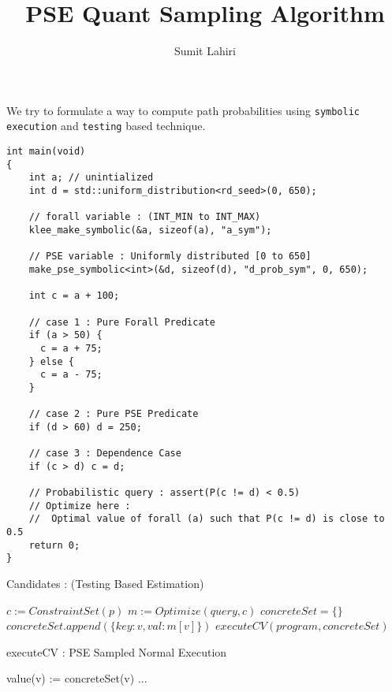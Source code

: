 \documentclass{article}
\title{PSE Quant Sampling Algorithm}
\author{Sumit Lahiri}
\begin{document}
\maketitle

We try to formulate a way to compute path probabilities using \texttt{symbolic execution} and \texttt{testing} based technique.
\begin{verbatim} 
int main(void)
{
	int a; // unintialized
	int d = std::uniform_distribution<rd_seed>(0, 650);
	
	// forall variable : (INT_MIN to INT_MAX)
	klee_make_symbolic(&a, sizeof(a), "a_sym");
	
	// PSE variable : Uniformly distributed [0 to 650]
	make_pse_symbolic<int>(&d, sizeof(d), "d_prob_sym", 0, 650);
	
	int c = a + 100;
	
	// case 1 : Pure Forall Predicate
	if (a > 50) {
	  c = a + 75;
	} else {
	  c = a - 75;
	}
	
	// case 2 : Pure PSE Predicate
	if (d > 60) d = 250;
	
	// case 3 : Dependence Case
	if (c > d) c = d;

	// Probabilistic query : assert(P(c != d) < 0.5)
	// Optimize here : 
	//	Optimal value of forall (a) such that P(c != d) is close to 0.5 	
	return 0;
}
\end{verbatim}

\begin{algorithm}[H]
	\caption{Candidates : (Testing Based Estimation)}
	\begin{algorithmic}[1]
		\State $c := ConstraintSet(p)$ 
		\State $m := Optimize(query,  c)$ 
		\State $concreteSet = \{ \}$
		\State $concreteSet.append(\{key : v, val : m[v]\})$ 
		\EndForEach
		\State $executeCV(program, concreteSet)$
		\EndForEach
	\end{algorithmic}
\end{algorithm}

\begin{algorithm}[H]
	\caption{executeCV : PSE Sampled Normal Execution}
	\begin{algorithmic}[1]
		\State value(v) := concreteSet(v) 
		\EndForEach
		\State ... 
		\EndFunction
	\end{algorithmic}
\end{algorithm}
\end{document}
